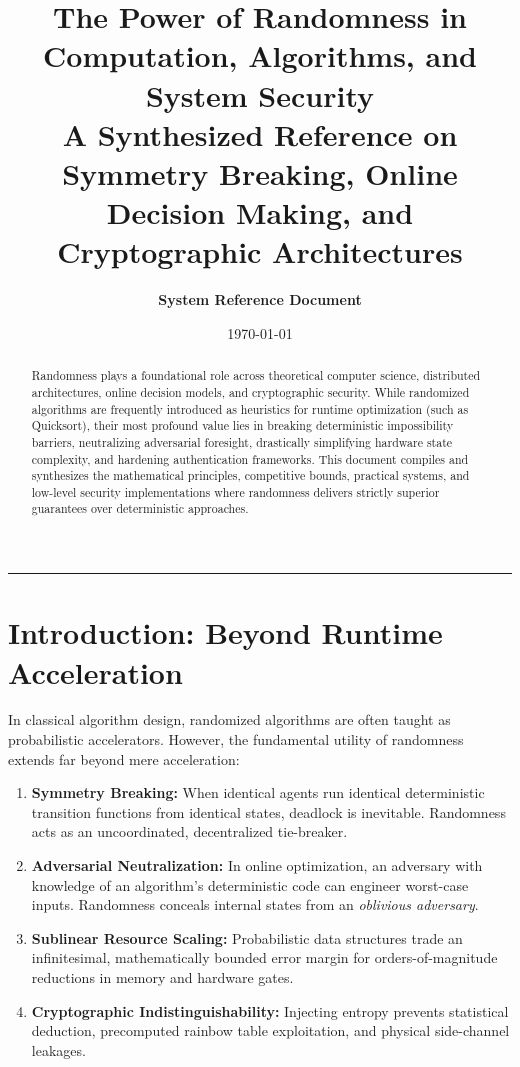 \documentclass[11pt,a4paper]{article}
\title{\textbf{\LARGE The Power of Randomness in Computation, Algorithms, and System Security}\\[0.4em]
\large A Synthesized Reference on Symmetry Breaking, Online Decision Making, and Cryptographic Architectures}
\author{\textbf{System Reference Document}}
\date{\today}
\begin{document}
\maketitle

\begin{abstract}
Randomness plays a foundational role across theoretical computer science, distributed architectures, online decision models, and cryptographic security. While randomized algorithms are frequently introduced as heuristics for runtime optimization (such as Quicksort), their most profound value lies in breaking deterministic impossibility barriers, neutralizing adversarial foresight, drastically simplifying hardware state complexity, and hardening authentication frameworks. This document compiles and synthesizes the mathematical principles, competitive bounds, practical systems, and low-level security implementations where randomness delivers strictly superior guarantees over deterministic approaches.
\end{abstract}

\tableofcontents
\vspace{1.5em}
\hrule
\vspace{1.5em}

\section{Introduction: Beyond Runtime Acceleration}
In classical algorithm design, randomized algorithms are often taught as probabilistic accelerators. However, the fundamental utility of randomness extends far beyond mere acceleration:
\begin{enumerate}
    \item \textbf{Symmetry Breaking:} When identical agents run identical deterministic transition functions from identical states, deadlock is inevitable. Randomness acts as an uncoordinated, decentralized tie-breaker.
    \item \textbf{Adversarial Neutralization:} In online optimization, an adversary with knowledge of an algorithm's deterministic code can engineer worst-case inputs. Randomness conceals internal states from an \textit{oblivious adversary}.
    \item \textbf{Sublinear Resource Scaling:} Probabilistic data structures trade an infinitesimal, mathematically bounded error margin for orders-of-magnitude reductions in memory and hardware gates.
    \item \textbf{Cryptographic Indistinguishability:} Injecting entropy prevents statistical deduction, precomputed rainbow table exploitation, and physical side-channel leakages.
\end{enumerate}
\end{document}
